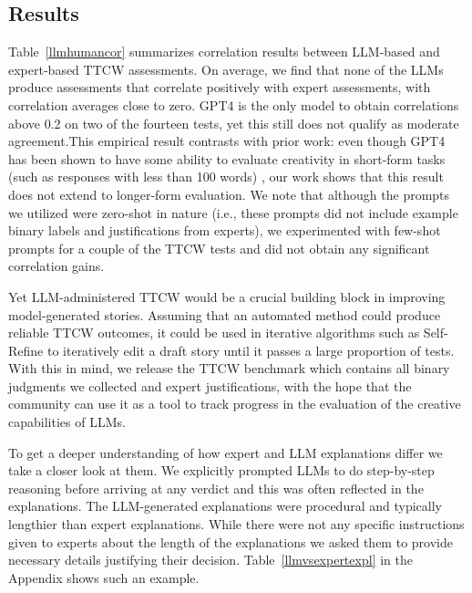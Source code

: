 \subsection{Results}

Table~\ref{llmhumancor} summarizes correlation results between LLM-based and expert-based TTCW assessments. On average, we find that none of the LLMs produce assessments that correlate positively with expert assessments, with correlation averages close to zero. GPT4 is the only model to obtain correlations above 0.2 on two of the fourteen tests, yet this still does not qualify as moderate agreement.This empirical result contrasts with prior work: even though GPT4 has been shown to have some ability to evaluate creativity in short-form tasks (such as responses with less than 100 words) \cite{rajani2023llm_labels}, our work shows that this result does not extend to longer-form evaluation. We note that although the prompts we utilized were zero-shot in nature (i.e., these prompts did not include example binary labels and justifications from experts), we experimented with few-shot prompts for a couple of the TTCW tests and did not obtain any significant correlation gains.

Yet LLM-administered TTCW would be a crucial building block in improving model-generated stories. Assuming that an automated method could produce reliable TTCW outcomes, it could be used in iterative algorithms such as Self-Refine \cite{madaan2023self} to iteratively edit a draft story until it passes a large proportion of tests. With this in mind, we release the TTCW benchmark which contains all binary judgments we collected and expert justifications, with the hope that the community can use it as a tool to track progress in the evaluation of the creative capabilities of LLMs.


To get a deeper understanding of how expert and LLM explanations differ we take a closer look at them. We explicitly prompted LLMs to do step-by-step reasoning before arriving at any verdict and this was often reflected in the explanations. The LLM-generated explanations were procedural and typically lengthier than expert explanations. While there were not any specific instructions given to experts about the length of the explanations we asked them to provide necessary details justifying their decision. Table~\ref{llmvsexpertexpl} in the Appendix shows such an example. 